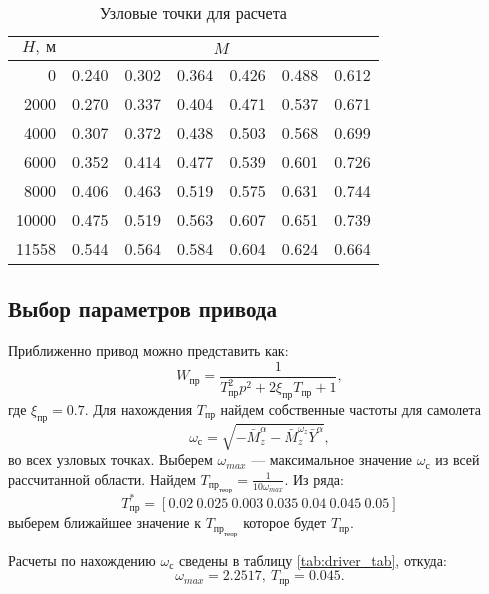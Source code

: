 \begin{table}[H]
    \centering
    \caption{Узловые точки для расчета}
    \label{tab:fa}
\begin{tabular}{|r|rrrrrr|}
    \hline
    $H,\ м$ & \multicolumn{6}{c|}{$M$}\\
\hline
0 & 0.240 & 0.302 & 0.364 & 0.426 & 0.488 & 0.612 \\
\hline
2000 & 0.270 & 0.337 & 0.404 & 0.471 & 0.537 & 0.671 \\
\hline
4000 & 0.307 & 0.372 & 0.438 & 0.503 & 0.568 & 0.699 \\
\hline
6000 & 0.352 & 0.414 & 0.477 & 0.539 & 0.601 & 0.726 \\
\hline
8000 & 0.406 & 0.463 & 0.519 & 0.575 & 0.631 & 0.744 \\
\hline
10000 & 0.475 & 0.519 & 0.563 & 0.607 & 0.651 & 0.739 \\
\hline
11558 & 0.544 & 0.564 & 0.584 & 0.604 & 0.624 & 0.664 \\
\hline
\end{tabular}
\end{table}

\subsection{Выбор параметров привода}
Приближенно привод можно представить как:
\[
    W_\text{пр} = \frac{1}{ T_\text{пр}^2 p^2 + 2 \xi_{\text{пр}}T_\text{пр}+ 1}, 
\]
где $\xi_{\text{пр}}=0.7$. Для нахождения $T_{\text{пр}}$ найдем собственные частоты для самолета
\[
\omega_\text{с} = \sqrt{-\bar{M}_z^\alpha - \bar{M}_z^{ \omega_z} \bar{Y}^\alpha},
\]
во всех узловых точках. Выберем $\omega_{max}$ --- максимальное значение
$\omega_{\text{с}}$ из всей рассчитанной области. Найдем $T_{{\text{пр}}_{\text{теор}}} =
\frac{1}{10\omega_{max}}$.
Из ряда: 
\[
  T_{\text{пр}}^* = [0.02 \ 0.025 \ 0.003 \ 0.035 \ 0.04 \ 0.045 \ 0.05]  
\]
выберем ближайшее значение к $T_{{\text{пр}}_{\text{теор}}}$ которое будет $T_{\text{пр}}$.

Расчеты по нахождению $\omega_с$ сведены в таблицу \ref{tab:driver_tab}, откуда:
\[
    \omega_{max} = 2.2517,\ T_{\text{пр}} = 0.045.
\]

